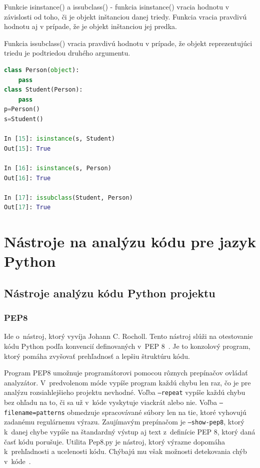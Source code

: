 \documentclass[11pt,oneside,final]{fithesis2}
\begin{document}
\begin{list}{•}{}
		\item Funkcie isinstance() a issubclass() - 
		funkcia isinstance() vracia hodnotu v závislosti od toho, či je objekt inštanciou danej triedy. Funkcia vracia pravdivú hodnotu aj v prípade, že je objekt inštanciou jej predka.
		
		Funkcia issubclass() vracia pravdivú hodnotu v prípade, že objekt reprezentujúci triedu je podtriedou druhého argumentu.

\begin{lstlisting}[language=python]	
class Person(object):
    pass
class Student(Person):
    pass
p=Person()
s=Student()

In [15]: isinstance(s, Student)
Out[15]: True

In [16]: isinstance(s, Person)
Out[16]: True

In [17]: issubclass(Student, Person)
Out[17]: True
\end{lstlisting}		

\end{list}


\chapter{Nástroje na analýzu kódu pre jazyk Python}
	\section{Nástroje analýzu kódu Python projektu}	


\subsection{PEP8}
	Ide o~nástroj, ktorý vyvíja Johann C. Rocholl. Tento nástroj slúži na otestovanie kódu Python podľa konvencií definovaných v~PEP 8~\cite{pep8}. Je to konzolový program, ktorý pomáha zvyšovať prehľadnosť a lepšiu štruktúru kódu. 
	
	Program PEP8 umožnuje programátorovi pomocou rôznych prepínačov ovládať analyzátor. V~predvolenom móde vypíše program každú chybu len raz, čo je pre analýzu rozsiahlejšieho projektu nevhodné. Voľba \texttt{–repeat} vypíše každú chybu bez ohľadu na to, či sa už v~kóde vyskytuje viackrát alebo nie. Voľba \texttt{–filename=patterns} obmedzuje spracovávané súbory len na tie, ktoré vyhovujú zadanému regulárnemu výrazu. Zaujímavým prepínačom je \texttt{–show-pep8}, ktorý k~danej chybe vypíše na štandardný výstup aj text z~definície PEP 8, ktorý daná časť kódu porušuje.
    Utilita Pep8.py je nástroj, ktorý výrazne dopomáha k~prehľadnosti a ucelenosti kódu. Chýbajú mu však možnosti detekovania chýb v~kóde~\cite{pep8}.
\end{document}
